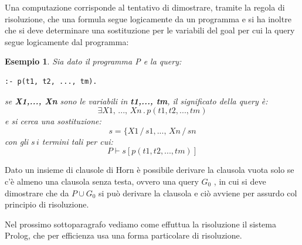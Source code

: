 \documentclass[a4paper]{report}
\newtheorem{esempio}{Esempio}
\begin{document}
Una computazione corrisponde al tentativo di dimostrare, tramite la regola di risoluzione, che una formula segue logicamente da un programma
e si ha inoltre che si deve determinare una sostituzione per le variabili del goal per cui la query segue  logicamente dal programma:
\begin{esempio}
Sia dato il programma P e la query:
\begin{verbatim}
:- p(t1, t2, ..., tm).
\end{verbatim}
se \textbf{X1,..., Xn} sono le variabili in \textbf{t1,..., tm}, il significato della query è:
\begin{equation*}
  \exists X1,\,..., \,Xn\, . \,p(t1, t2, ..., tm)
\end{equation*}
e si cerca una sostituzione:
\begin{equation*}
  s=\{X1\,/\,s1,...,\, Xn\,/\,sn
\end{equation*}
con gli $s\,i$ termini tali per cui:
\begin{equation*}
  P\vdash s[p(t1, t2, ..., tm)]
\end{equation*}
\end{esempio}
Dato un insieme di clausole di Horn è possibile derivare la clausola vuota solo se c'è almeno una clausola senza testa, ovvero una query $G_0$
, in cui si deve dimostrare che da $P \cup G_0$ si può derivare la clausola e ciò avviene per assurdo col principio di risoluzione.

Nel prossimo sottoparagrafo vediamo come effuttua la risoluzione il sistema Prolog, che per efficienza usa una forma particolare di risoluzione.
\end{document}
